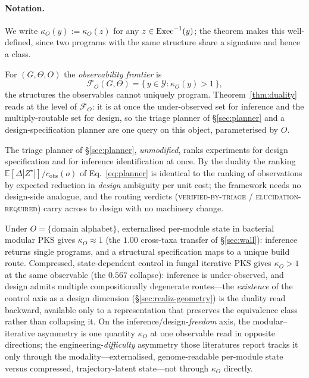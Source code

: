 \paragraph{Notation.} We write $\kappa_O(y):=\kappa_O(z)$ for any $z\in\mathrm{Exec}^{-1}(y)$; the theorem makes
this well-defined, since two programs with the same structure share a signature and hence a class.

\begin{definition}
For $(G,\Theta,O)$ the \emph{observability frontier} is
\begin{equation}
\mathcal{F}_O(G,\Theta)=\{\,y\in\mathcal{Y}:\kappa_O(y)>1\,\},
\label{eq:frontier}
\end{equation}
the structures the observables cannot uniquely program. Theorem~\ref{thm:duality} reads at the level of
$\mathcal{F}_O$: it is at once the under-observed set for inference and the multiply-routable set for
design, so the triage planner of \S\ref{sec:planner} and a design-specification planner are one query on
this object, parameterised by $O$.
\end{definition}

\begin{corollary}
The triage planner of \S\ref{sec:planner}, \emph{unmodified}, ranks experiments for design specification
and for inference identification at once. By the duality the ranking
$\mathbb{E}[\Delta|Z^{\star}|]/c_{\mathrm{obs}}(o)$ of Eq.~\eqref{eq:planner} is identical to the ranking of
observations by expected reduction in \emph{design} ambiguity per unit cost; the framework needs no
design-side analogue, and the routing verdicts (\textsc{verified-by-triage} / \textsc{elucidation-required})
carry across to design with no machinery change.
\end{corollary}

\begin{corollary}
Under $O=\{\text{domain alphabet}\}$, externalised per-module state in bacterial modular PKS gives
$\kappa_O\approx1$ (the $1.00$ cross-taxa transfer of \S\ref{sec:wall}): inference returns single programs,
and a structural specification maps to a unique build route. Compressed, state-dependent control in fungal
iterative PKS gives $\kappa_O>1$ at the same observable (the $0.567$ collapse): inference is under-observed,
and design admits multiple compositionally degenerate routes---the \emph{existence} of the control axis as
a design dimension (\S\ref{sec:realiz-geometry}) is the duality read backward, available only to a
representation that preserves the equivalence class rather than collapsing it. On the inference/design-\emph{freedom} axis, the modular--iterative asymmetry is one quantity $\kappa_O$
at one observable read in opposite directions; the engineering-\emph{difficulty} asymmetry those literatures
\citep{yuzawa2018,clustercad2,cox2023} report tracks it only through the modality---externalised,
genome-readable per-module state versus compressed, trajectory-latent state---not through $\kappa_O$
directly.
\end{corollary}


